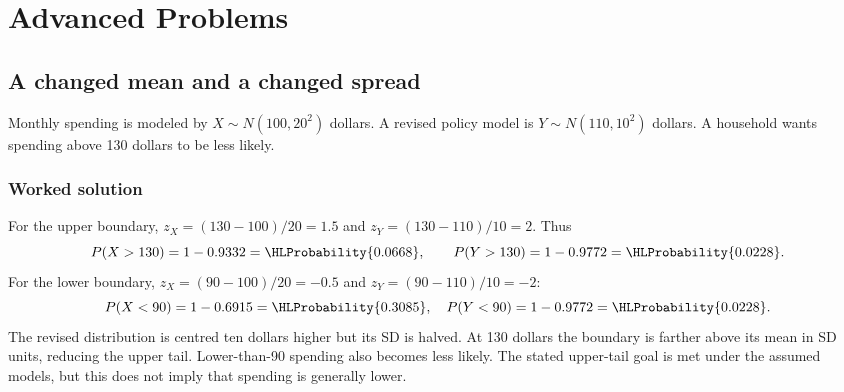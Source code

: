 \section{Advanced Problems}\label{sec:advanced}

\subsection{A changed mean and a changed spread}\label{prob:sec:advanced0}
Monthly spending is modeled by $X\sim N(100,20^2)$ dollars. A revised policy model is $Y\sim N(110,10^2)$ dollars. A household wants spending above 130 dollars to be less likely.
\subsubsection*{Worked solution}\label{sol:sec:advanced0}
For the upper boundary, $z_X=(130-100)/20=1.5$ and $z_Y=(130-110)/10=2$. Thus
\[
P(X>130)=1-0.9332=\HLProbability{0.0668},\qquad
P(Y>130)=1-0.9772=\HLProbability{0.0228}.
\]
For the lower boundary, $z_X=(90-100)/20=-0.5$ and $z_Y=(90-110)/10=-2$:
\[
P(X<90)=1-0.6915=\HLProbability{0.3085},\quad
P(Y<90)=1-0.9772=\HLProbability{0.0228}.
\]
The revised distribution is centred ten dollars higher but its SD is halved. At 130 dollars the boundary is farther above its mean in SD units, reducing the upper tail. Lower-than-90 spending also becomes less likely. The stated upper-tail goal is met under the assumed models, but this does not imply that spending is generally lower.



